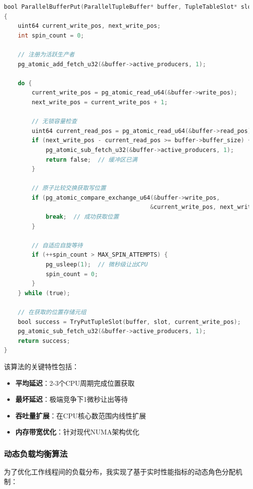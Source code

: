 \begin{lstlisting}[language=C, caption=无锁写入操作核心算法]
bool ParallelBufferPut(ParallelTupleBuffer* buffer, TupleTableSlot* slot)
{
    uint64 current_write_pos, next_write_pos;
    int spin_count = 0;
    
    // 注册为活跃生产者
    pg_atomic_add_fetch_u32(&buffer->active_producers, 1);
    
    do {
        current_write_pos = pg_atomic_read_u64(&buffer->write_pos);
        next_write_pos = current_write_pos + 1;
        
        // 无锁容量检查
        uint64 current_read_pos = pg_atomic_read_u64(&buffer->read_pos);
        if (next_write_pos - current_read_pos >= buffer->buffer_size) {
            pg_atomic_sub_fetch_u32(&buffer->active_producers, 1);
            return false;  // 缓冲区已满
        }
        
        // 原子比较交换获取写位置
        if (pg_atomic_compare_exchange_u64(&buffer->write_pos,
                                          &current_write_pos, next_write_pos)) {
            break;  // 成功获取位置
        }
        
        // 自适应自旋等待
        if (++spin_count > MAX_SPIN_ATTEMPTS) {
            pg_usleep(1);  // 微秒级让出CPU
            spin_count = 0;
        }
    } while (true);
    
    // 在获取的位置存储元组
    bool success = TryPutTupleSlot(buffer, slot, current_write_pos);
    pg_atomic_sub_fetch_u32(&buffer->active_producers, 1);
    return success;
}
\end{lstlisting}

该算法的关键特性包括：
\begin{itemize}
    \item \textbf{平均延迟}：2-3个CPU周期完成位置获取
    \item \textbf{最坏延迟}：极端竞争下1微秒让出等待
    \item \textbf{吞吐量扩展}：在CPU核心数范围内线性扩展
    \item \textbf{内存带宽优化}：针对现代NUMA架构优化
\end{itemize}

\subsubsection{动态负载均衡算法}

为了优化工作线程间的负载分布，我实现了基于实时性能指标的动态角色分配机制：


